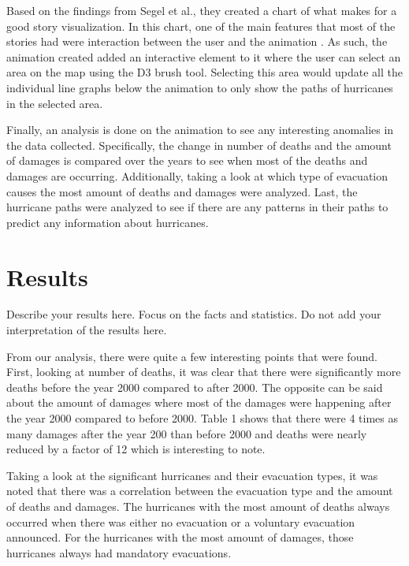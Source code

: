 Based on the findings from Segel et al., they created a chart of what makes for a good story visualization. In this chart, one of the main features that most of the stories had were interaction between the user and the animation \cite{segel2010narrative}. As such, the animation created added an interactive element to it where the user can select an area on the map using the D3 brush tool. Selecting this area would update all the individual line graphs below the animation to only show the paths of hurricanes in the selected area. 

\multipleViews

Finally, an analysis is done on the animation to see any interesting anomalies in the data collected. Specifically, the change in number of deaths and the amount of damages is compared over the years to see when most of the deaths and damages are occurring. Additionally, taking a look at which type of evacuation causes the most amount of deaths and damages were analyzed. Last, the hurricane paths were analyzed to see if there are any patterns in their paths to predict any information about hurricanes. 

\section{Results}
Describe your results here. Focus on the facts and statistics. Do not add your interpretation of the results here.

From our analysis, there were quite a few interesting points that were found. First, looking at number of deaths, it was clear that there were significantly more deaths before the year 2000 compared to after 2000. The opposite can be said about the amount of damages where most of the damages were happening after the year 2000 compared to before 2000. Table 1 shows that there were 4 times as many damages after the year 200 than before 2000 and deaths were nearly reduced by a factor of 12 which is interesting to note.

\deathsDamagesTable

Taking a look at the significant hurricanes and their evacuation types, it was noted that there was a correlation between the evacuation type and the amount of deaths and damages. The hurricanes with the most amount of deaths always occurred when there was either no evacuation or a voluntary evacuation announced. For the hurricanes with the most amount of damages, those hurricanes always had mandatory evacuations.

